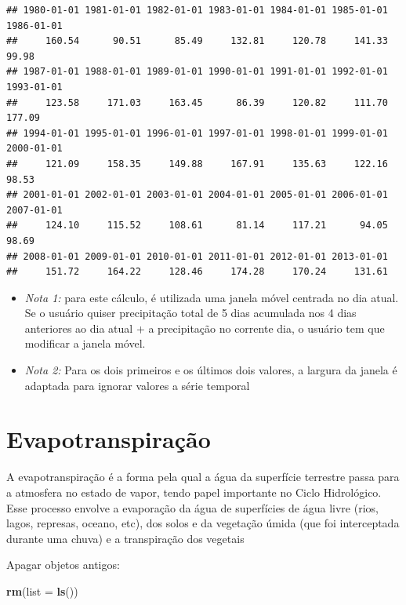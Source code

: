 \documentclass[
]{book}
\newenvironment{Shaded}{\begin{snugshade}}{\end{snugshade}}
\newcommand{\DataTypeTok}[1]{\textcolor[rgb]{0.13,0.29,0.53}{#1}}
\newcommand{\KeywordTok}[1]{\textcolor[rgb]{0.13,0.29,0.53}{\textbf{#1}}}
\newcommand{\NormalTok}[1]{#1}
\begin{document}
\begin{verbatim}
## 1980-01-01 1981-01-01 1982-01-01 1983-01-01 1984-01-01 1985-01-01 1986-01-01 
##     160.54      90.51      85.49     132.81     120.78     141.33      99.98 
## 1987-01-01 1988-01-01 1989-01-01 1990-01-01 1991-01-01 1992-01-01 1993-01-01 
##     123.58     171.03     163.45      86.39     120.82     111.70     177.09 
## 1994-01-01 1995-01-01 1996-01-01 1997-01-01 1998-01-01 1999-01-01 2000-01-01 
##     121.09     158.35     149.88     167.91     135.63     122.16      98.53 
## 2001-01-01 2002-01-01 2003-01-01 2004-01-01 2005-01-01 2006-01-01 2007-01-01 
##     124.10     115.52     108.61      81.14     117.21      94.05      98.69 
## 2008-01-01 2009-01-01 2010-01-01 2011-01-01 2012-01-01 2013-01-01 
##     151.72     164.22     128.46     174.28     170.24     131.61
\end{verbatim}

\begin{itemize}
\item
  \emph{Nota 1:} para este cálculo, é utilizada uma janela móvel centrada no dia atual. Se o usuário quiser precipitação total de 5 dias acumulada nos 4 dias anteriores ao dia atual + a precipitação no corrente dia, o usuário tem que modificar a janela móvel.
\item
  \emph{Nota 2:} Para os dois primeiros e os últimos dois valores, a largura da janela é adaptada para ignorar valores a série temporal
\end{itemize}

\hypertarget{evapotranspirauxe7uxe3o}{%
\section{Evapotranspiração}\label{evapotranspirauxe7uxe3o}}

A evapotranspiração é a forma pela qual a água da superfície terrestre passa para a atmosfera no estado de vapor, tendo papel importante no Ciclo Hidrológico. Esse processo envolve a evaporação da água de superfícies de água livre (rios, lagos, represas, oceano, etc), dos solos e da vegetação úmida (que foi interceptada durante uma chuva) e a transpiração dos vegetais

Apagar objetos antigos:

\begin{Shaded}
\begin{Highlighting}[]
 \KeywordTok{rm}\NormalTok{(}\DataTypeTok{list =} \KeywordTok{ls}\NormalTok{())}
\end{Highlighting}
\end{Shaded}
\end{document}
